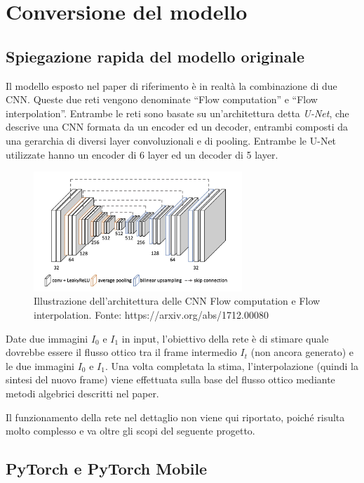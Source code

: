 \chapter{Conversione del modello}

\section{Spiegazione rapida del modello originale}

Il modello esposto nel paper di riferimento è in realtà la combinazione di due CNN. Queste due reti vengono denominate
``Flow computation'' e ``Flow interpolation''. Entrambe le reti sono basate su un'architettura detta \emph{U-Net}, che
descrive una CNN formata da un encoder ed un decoder, entrambi composti da una gerarchia di diversi layer convoluzionali
e di pooling.
Entrambe le U-Net utilizzate hanno un encoder di 6 layer ed un decoder di 5 layer.

\begin{figure}[h!]
    \includegraphics[width=0.7\textwidth]{img/architettura_slomo.jpg}
    \centering
    \caption{Illustrazione dell'architettura delle CNN Flow computation e Flow interpolation. Fonte: https://arxiv.org/abs/1712.00080}
    \label{fig:architettura_slomo}
\end{figure}

Date due immagini $I_0$ e $I_1$ in input, l'obiettivo della rete è di stimare quale dovrebbe essere il flusso ottico tra 
il frame intermedio $I_t$ (non ancora generato) e le due immagini $I_0$ e $I_1$. Una volta completata la stima,
l'interpolazione (quindi la sintesi del nuovo frame) viene effettuata sulla base del flusso ottico mediante metodi 
algebrici descritti nel paper.

Il funzionamento della rete nel dettaglio non viene qui riportato, poiché risulta molto complesso e va oltre gli scopi
del seguente progetto.

\section{PyTorch e PyTorch Mobile}

